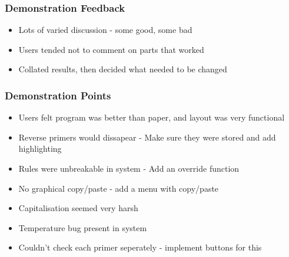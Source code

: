  
\begin{frame}

\frametitle{Demonstration Feedback}
\begin{itemize}
\item Lots of varied discussion - some good, some bad
\item Users tended not to comment on parts that worked
\item Collated results, then decided what needed to be changed
\end{itemize}
\end{frame}    

\begin{frame}
\frametitle{Demonstration Points}

\begin{itemize}
\item Users felt program was better than paper, and layout was very functional
\item Reverse primers would dissapear - Make sure they were stored and add highlighting
\item Rules were unbreakable in system - Add an override function
\item No graphical copy/paste - add a menu with copy/paste
\item Capitalisation seemed very harsh
\item Temperature bug present in system
\item Couldn't check each primer seperately - implement buttons for this
\end{itemize}
\end{frame}    

